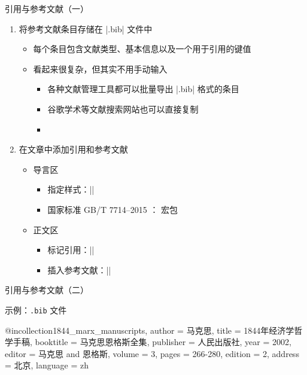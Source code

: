 \begin{frame}[fragile]{引用与参考文献（一）}
  \begin{enumerate}
    \item 将参考文献条目存储在 |.bib| 文件中
          \begin{itemize}
            \item 每个条目包含文献类型、基本信息以及一个用于引用的键值
            \item 看起来很复杂，但其实不用手动输入
                  \begin{itemize}
                    \item 各种文献管理工具都可以批量导出 |.bib| 格式的条目
                    \item 谷歌学术等文献搜索网站也可以直接复制
                    \item {}
                  \end{itemize}
          \end{itemize}
    \item 在文章中添加引用和参考文献
          \begin{itemize}
            \item 导言区
                  \begin{itemize}
                    \item 指定样式：||
                    \item 国家标准 GB/T 7714--2015
                          ：
                           宏包
                  \end{itemize}
            \item 正文区
                  \begin{itemize}
                    \item 标记引用：|\cite{键值}|
                    \item 插入参考文献：||
                  \end{itemize}
          \end{itemize}
  \end{enumerate}
\end{frame}

\begin{frame}[fragile]{引用与参考文献（二）}
  \begin{exampleblock}{示例：\texttt{.bib} 文件}
    \begin{texcode}[gobble=6]
      @incollection{1844_marx_manuscripts,
        author    = {马克思},
        title     = {1844年经济学哲学手稿},
        booktitle = {马克思恩格斯全集},
        publisher = {人民出版社},
        year      = 2002,
        editor    = {马克思 and 恩格斯},
        volume    = 3,
        pages     = {266-280},
        edition   = 2,
        address   = {北京},
        language  = {zh}
      }
    \end{texcode}
  \end{exampleblock}
\end{frame}

